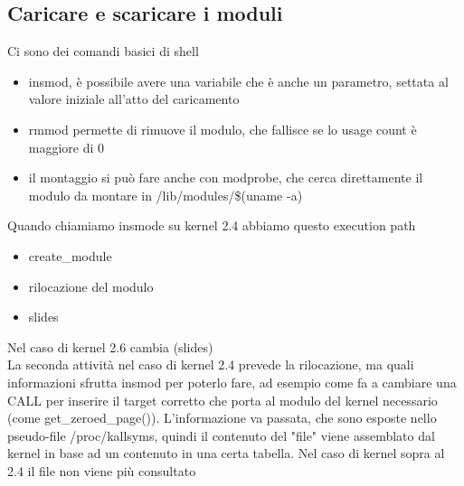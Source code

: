 \documentclass[12pt, oneside]{extbook}
\begin{document}
\subsection{Caricare e scaricare i moduli}
Ci sono dei comandi basici di shell
\begin{itemize}
\item \textsf{insmod}, è possibile avere una variabile che è anche un parametro, settata al valore iniziale all'atto del caricamento
\item \textsf{rmmod} permette di rimuove il modulo, che fallisce se lo usage count è maggiore di 0
\item il montaggio si può fare anche con \textsf{modprobe}, che cerca direttamente il modulo da montare in /lib/modules/\$(uname -a)
\end{itemize}
Quando chiamiamo insmode su kernel 2.4 abbiamo questo execution path
\begin{itemize}
\item create\_module
\item rilocazione del modulo
\item slides
\end{itemize}
Nel caso di kernel 2.6 cambia
(slides)\\La seconda attività nel caso di kernel 2.4 prevede la rilocazione, ma quali informazioni sfrutta insmod per poterlo fare, ad esempio come fa a cambiare una CALL per inserire il target corretto che porta al modulo del kernel necessario (come get\_zeroed\_page()). L'informazione va passata, che sono esposte nello pseudo-file /proc/kallsyms, quindi il contenuto del "file" viene assemblato dal kernel in base ad un contenuto in una certa tabella. Nel caso di kernel sopra al 2.4 il file non viene più consultato
\end{document}
